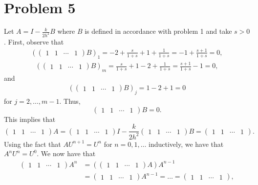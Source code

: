 \documentclass{article}
\begin{document}
\section{Problem 5}
Let $A=I - \frac{k}{2h^2}B$ where $B$ is defined in accordance with problem 1 and take $s>0$. First, observe that
\begin{align*}
	\left(\begin{pmatrix} 1 & 1 & \cdots & 1 \end{pmatrix} B\right)_1=-2+\frac{s}{1+s}+1+\frac{1}{1+s}=-1+\frac{s+1}{1+s}=0,
\end{align*}
\begin{align*}
\left(\begin{pmatrix} 1 & 1 & \cdots & 1 \end{pmatrix} B\right)_m=\frac{s}{1+s}+1-2+\frac{1}{1+s}=\frac{s+1}{1+s}-1=0,
\end{align*}
and 
\begin{align*}
\left(\begin{pmatrix} 1 & 1 & \cdots & 1 \end{pmatrix} B\right)_j=1-2+1=0
\end{align*}
for $j=2,\ldots,m-1$. Thus,
\[
\begin{pmatrix} 1 & 1 & \cdots & 1 \end{pmatrix} B=0.
\]
This implies that 
\[
\begin{pmatrix} 1 & 1 & \cdots & 1 \end{pmatrix} A=\begin{pmatrix} 1 & 1 & \cdots & 1 \end{pmatrix}I-\frac{k}{2h^2}\begin{pmatrix} 1 & 1 & \cdots & 1 \end{pmatrix}B=\begin{pmatrix} 1 & 1 & \cdots & 1 \end{pmatrix}.
\]
Using the fact that $AU^{n+1}=U^n$ for $n=0,1,\ldots$ inductively, we have that $A^nU^n=U^0$. We now have that
\begin{align*}
	\begin{pmatrix} 1 & 1 & \cdots & 1 \end{pmatrix} A^n&=\left(\begin{pmatrix} 1 & 1 & \cdots & 1 \end{pmatrix}A\right)A^{n-1}\\&=
	\begin{pmatrix} 1 & 1 & \cdots & 1 \end{pmatrix} A^{n-1}=\ldots=\begin{pmatrix} 1 & 1 & \cdots & 1 \end{pmatrix},
\end{align*}
\end{document}
